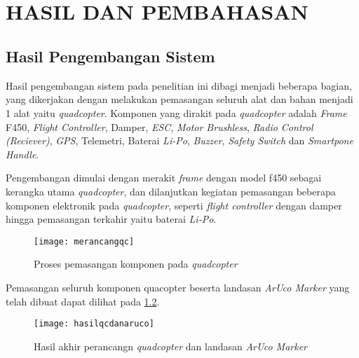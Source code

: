 
\chapter[HASIL DAN PEMBAHASAN]{\\ HASIL DAN PEMBAHASAN}

\section{Hasil Pengembangan Sistem}

Hasil pengembangan sistem pada penelitian ini dibagi menjadi beberapa bagian, yang dikerjakan dengan melakukan pemasangan seluruh alat dan bahan menjadi 1 alat yaitu \textit{quadcopter}.
Komponen yang dirakit pada \textit{quadcopter} adalah \textit{Frame} F450, \textit{Flight Controller}, Damper, \textit{ESC}, \textit{Motor Brushless}, \textit{Radio Control (Reciever)}, \textit{GPS}, Telemetri, Baterai \textit{Li-Po}, \textit{Buzzer}, \textit{Safety Switch} dan \textit{Smartpone Handle}.

Pengembangan dimulai dengan merakit \textit{frame} dengan model f450 sebagai kerangka utama \textit{quadcopter}, dan dilanjutkan kegiatan pemasangan beberapa komponen elektronik pada \textit{quadcopter}, seperti \textit{flight controller} dengan damper hingga pemasangan terkahir yaitu baterai \textit{Li-Po}.

\begin{figure}[H]
	\centering
	\texttt{[image: merancangqc]}
	\caption{Proses pemasangan komponen pada \textit{quadcopter}}
	\label{fig:merancangqc}
\end{figure}

Pemasangan seluruh komponen quacopter beserta landasan \textit{ArUco Marker} yang telah dibuat dapat dilihat pada \cref{fig:hasilqcdanaruco}.

\begin{figure}[H]
	\centering
	\texttt{[image: hasilqcdanaruco]}
	\caption{Hasil akhir perancangn \textit{quadcopter} dan landasan \textit{ArUco Marker}}
	\label{fig:hasilqcdanaruco}
\end{figure}

